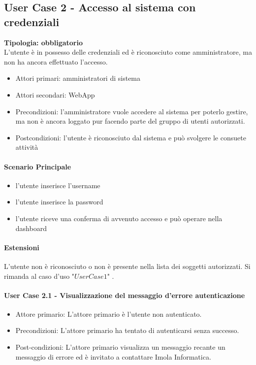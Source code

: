 \documentclass[12pt]{article}
\begin{document}
\subsection{User Case 2 - Accesso al sistema con credenziali}
\textbf{Tipologia: obbligatorio} \\
L'utente è in possesso delle credenziali ed è riconosciuto come amministratore, ma non ha ancora effettuato l'accesso.
\begin{itemize}
	\item Attori primari: amministratori di sistema
	\item Attori secondari: WebApp
	\item Precondizioni: l'amministratore vuole accedere al sistema per poterlo gestire, ma non è ancora loggato pur facendo parte del gruppo di utenti autorizzati.
	\item Postcondizioni: l'utente è riconosciuto dal sistema e può svolgere le consuete attività
\end{itemize}
\paragraph{Scenario Principale}
\begin{itemize}
	\item l'utente inserisce l'username
	\item l'utente inserisce la password
	\item l'utente riceve una conferma di avvenuto accesso e può operare nella dashboard
\end{itemize}

\paragraph{Estensioni} L'utente non è riconosciuto o non è presente nella lista dei soggetti autorizzati. Si rimanda al caso d'uso "$User Case 1$" .

\paragraph{User Case 2.1 - Visualizzazione del messaggio d'errore autenticazione}
\begin{itemize}
	\item Attore primario: L'attore primario è l'utente non autenticato.
	\item Precondizioni: L'attore primario ha tentato di autenticarsi senza successo.
	\item Post-condizioni: L'attore primario visualizza un messaggio recante un messaggio di errore ed è invitato a contattare Imola Informatica.
\end{itemize}
\end{document}
